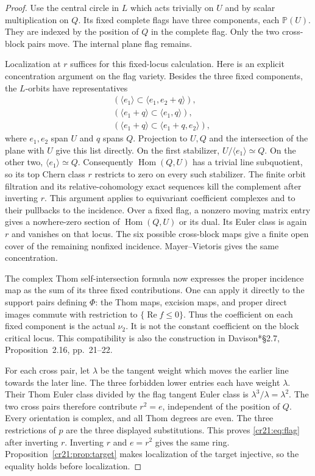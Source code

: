 \begin{proof}
Use the central circle in $L$ which acts trivially on $U$ and
by scalar multiplication on $Q$.
Its fixed complete flags have three components, each $\mathbb P(U)$.
They are indexed by the position of $Q$ in the complete flag.
Only the two cross-block pairs move. The internal plane flag remains.

Localization at $r$ suffices for this fixed-locus calculation.
Here is an explicit concentration argument on the flag variety.
Besides the three fixed components, the $L$-orbits have representatives
\[
 \begin{split}
 &(\langle e_1\rangle\subset\langle e_1,e_2+q\rangle),\\
 &(\langle e_1+q\rangle\subset\langle e_1,q\rangle),\\
 &(\langle e_1+q\rangle\subset\langle e_1+q,e_2\rangle),
 \end{split}
\]
where $e_1,e_2$ span $U$ and $q$ spans $Q$.
Projection to $U,Q$ and the intersection of the plane with $U$
give this list directly.
On the first stabilizer, $U/\langle e_1\rangle\simeq Q$.
On the other two, $\langle e_1\rangle\simeq Q$.
Consequently $\operatorname{Hom}(Q,U)$ has a trivial line subquotient,
so its top Chern class $r$ restricts to zero on every such stabilizer.
The finite orbit filtration and its relative-cohomology exact sequences
kill the complement after inverting $r$.
This argument applies to equivariant coefficient complexes and to
their pullbacks to the incidence.
Over a fixed flag, a nonzero moving matrix entry gives a nowhere-zero
section of $\operatorname{Hom}(Q,U)$ or its dual.
Its Euler class is again $r$ and vanishes on that locus.
The six possible cross-block maps give a finite open cover of the
remaining nonfixed incidence. Mayer--Vietoris gives the same concentration.

The complex Thom self-intersection formula now expresses the proper
incidence map as the sum of its three fixed contributions.
One can apply it directly to the support pairs defining $\Phi$:
the Thom maps, excision maps, and proper direct images commute with
restriction to $\{\operatorname{Re}f\leq0\}$.
Thus the coefficient on each fixed component is the actual $\nu_2$.
It is not the constant coefficient on the block critical locus.
This compatibility is also the construction in
Davison\cite{cr11Davison}*{\S2.7, Proposition~2.16, pp.~21--22}.

For each cross pair, let $\lambda$ be the tangent weight which
moves the earlier line towards the later line.
The three forbidden lower entries each have weight $\lambda$.
Their Thom Euler class divided by the flag tangent Euler class
is $\lambda^3/\lambda=\lambda^2$.
The two cross pairs therefore contribute $r^2=e$, independent
of the position of $Q$.
Every orientation is complex, and all Thom degrees are even.
The three restrictions of $p$ are the three displayed substitutions.
This proves \eqref{cr21:eq:flag} after inverting $r$.
Inverting $r$ and $e=r^2$ gives the same ring.
Proposition~\ref{cr21:prop:target} makes localization of the target
injective, so the equality holds before localization.
\end{proof}

